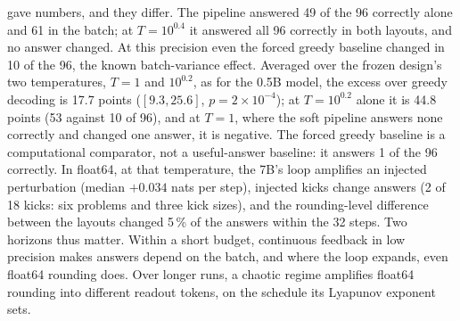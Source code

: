\documentclass[11pt,letterpaper]{article}
\begin{document}
gave numbers, and they differ. The pipeline answered 49 of the 96 correctly alone and 61 in the batch; at
$T=10^{0.4}$ it answered all 96 correctly in both layouts, and no answer changed. At this precision even the forced greedy baseline
changed in 10 of the 96, the known batch-variance effect. Averaged over the frozen design's two
temperatures, $T=1$ and $10^{0.2}$, as for the 0.5B model, the excess over greedy decoding is 17.7 points
($[9.3,25.6]$, $p=2\times10^{-4}$); at $T=10^{0.2}$ alone it is 44.8 points (53 against 10 of 96), and at $T=1$, where
the soft pipeline answers none correctly and changed one answer, it is negative. The forced greedy baseline is a
computational comparator, not a useful-answer baseline: it answers 1 of the 96 correctly. In float64, at that temperature, the 7B's loop amplifies an injected perturbation
(median $+0.034$ nats per step), injected kicks change answers (2 of 18 kicks: six problems and three kick sizes), and
the rounding-level difference between the layouts changed 5\,\% of the answers within the 32 steps.
Two horizons thus matter. Within a short budget, continuous feedback in low precision makes answers depend on the
batch, and where the loop expands, even float64 rounding does. Over longer runs, a chaotic regime amplifies float64
rounding into different readout tokens, on the schedule its Lyapunov exponent sets.
\end{document}
